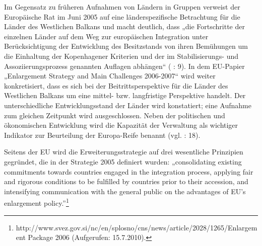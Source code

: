 Im Gegensatz zu früheren Aufnahmen von Ländern in Gruppen verweist der Europäische Rat im Juni 2005 auf eine länderspezifische Betrachtung für die Länder des Westlichen Balkans und macht deutlich, dass „die Fortschritte der einzelnen Länder auf dem Weg zur europäischen Integration unter Berücksichtigung der Entwicklung des Besitzstands von ihren Bemühungen um die Einhaltung der Kopenhagener Kriterien und der im Stabilisierungs- und Assoziierungsprozess genannten Auflagen abhängen“ (\cite{euko07} : 9). In dem EU-Papier „Enlargement Strategy and Main Challenges 2006-2007“ wird weiter konkretisiert, dass es sich bei der Beitrittsperspektive für die Länder des Westlichen Balkans um eine mittel- bzw. langfristige Perspektive handelt. Der unterschiedliche Entwicklungsstand der Länder wird konstatiert; eine Aufnahme zum gleichen Zeitpunkt wird ausgeschlossen. Neben der politischen und ökonomischen Entwicklung wird die Kapazität der Verwaltung als wichtiger Indikator zur Beurteilung der Europa-Reife benannt (vgl. \cite{eurcom06b} : 18).\par
Seitens der EU wird die Erweiterungsstrategie auf drei wesentliche Prinzipien gegründet, die in der Strategie 2005 definiert wurden: „consolidating existing commitments towards countries engaged in the integration process, applying fair and rigorous conditions to be fulfilled by countries prior to their accession, and intensifying communication with the general public on the advantages of EU’s enlargement policy.”\footnote{http://www.svez.gov.si/nc/en/splosno/cns/news/article/2028/1265/Enlargement Package 2006 (Aufgerufen: 15.7.2010).}\par

